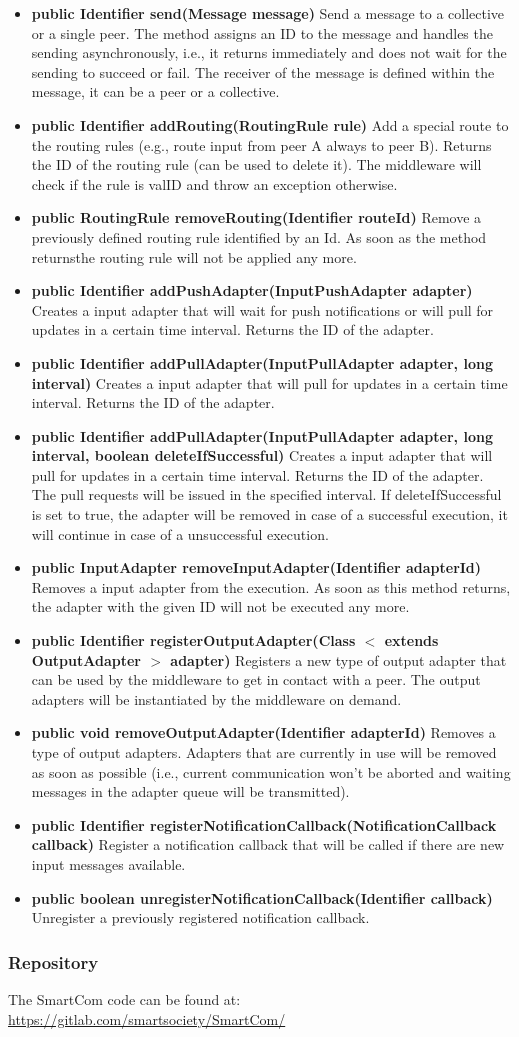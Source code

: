 \begin{itemize}
\item {\bf public Identifier send(Message message)} Send a message to a collective or a single peer. The method assigns an ID to the message and handles the sending asynchronously, i.e., it returns immediately and does not wait for the sending to succeed or fail. The receiver of the message is defined within the message, it can be a peer or a collective.
\item {\bf public Identifier addRouting(RoutingRule rule)} Add a special route to the routing rules (e.g., route input from peer A always to peer B). Returns the ID of the routing rule (can be used to delete it). The middleware will check if the rule is valID and throw an exception otherwise.
\item {\bf public RoutingRule removeRouting(Identifier routeId)} Remove a previously defined routing rule identified by an Id. As soon as the method returnsthe routing rule will not be applied any more. 
\item {\bf public Identifier addPushAdapter(InputPushAdapter adapter)} Creates a input adapter that will wait for push notifications or will pull for updates in a certain time interval. Returns the ID of the adapter.
 \item {\bf public Identifier addPullAdapter(InputPullAdapter adapter, long interval)} Creates a input adapter that will pull for updates in a certain time interval. Returns the ID of the adapter. 
 \item {\bf public Identifier addPullAdapter(InputPullAdapter adapter, long interval, boolean deleteIfSuccessful)} Creates a input adapter that will pull for updates in a certain time interval. Returns the ID of the adapter. The pull requests will be issued in the specified interval. If deleteIfSuccessful is set to true, the adapter will be removed in case of a successful execution, it will continue in case of a unsuccessful execution.
\item {\bf public InputAdapter removeInputAdapter(Identifier adapterId)}  Removes a input adapter from the execution. As soon as this method returns, the  adapter with the given ID will not be executed any more. 
\item {\bf public Identifier registerOutputAdapter(Class $<$ extends OutputAdapter $>$ adapter)} Registers a new type of output adapter that can be used by the middleware to get in contact with a peer. The output adapters will be instantiated by the middleware on demand. 
\item {\bf public void removeOutputAdapter(Identifier adapterId)} Removes a type of output adapters. Adapters that are currently in use will be removed as soon as possible (i.e., current communication won’t be aborted and waiting messages in the adapter queue will be transmitted).
\item {\bf public Identifier registerNotificationCallback(NotificationCallback callback)} Register a notification callback that will be called if there are new input messages available.
\item {\bf public boolean unregisterNotificationCallback(Identifier callback)} Unregister a previously registered notification callback.
\end{itemize}  
\subsubsection{Repository}
The SmartCom code can be found at: \url{https://gitlab.com/smartsociety/SmartCom/}
